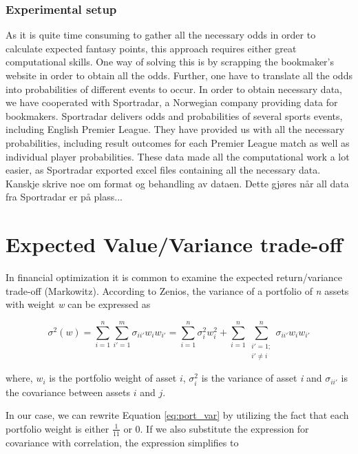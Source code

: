 \subsubsection{Experimental setup}
As it is quite time consuming to gather all the necessary odds in order to calculate expected fantasy points, this approach requires either great computational skills. One way of solving this is by scrapping the bookmaker's website in order to obtain all the odds. Further, one have to translate all the odds into probabilities of different events to occur. 
\newpar
In order to obtain necessary data, we have cooperated with Sportradar, a Norwegian company providing data for bookmakers. Sportradar delivers odds and probabilities of several sports events, including English Premier League. They have provided us with all the necessary probabilities, including result outcomes for each Premier League match as well as individual player probabilities. These data made all the computational work a lot easier, as Sportradar exported excel files containing all the necessary data. 
\newpar
Kanskje skrive noe om format og behandling av dataen. Dette gjøres når all data fra Sportradar er på plass...

\section{Expected Value/Variance trade-off}

In financial optimization it is common to examine the expected return/variance trade-off (Markowitz). According to Zenios, the variance of a portfolio of \textit{n} assets with weight \textit{w} can be expressed as 

\begin{equation}
    \sigma^2(w) = \sum_{i = 1}^{n}\sum_{i' = 1}^{m}\sigma_{ii'}w_iw_{i'} = \sum_{i = 1}^{n}\sigma_{i}^2w_i^2 + \sum_{i = 1}^{n}\sum_{\substack{i' = 1;\\ i' \neq i}}^{n}\sigma_{ii'}w_iw_{i'}
    \label{eq:port_var}
\end{equation}

where, $w_i$ is the portfolio weight of asset $i$, $\sigma_{i}^2$ is the variance of asset \textit{i} and $\sigma_{ii'}$ is the covariance between assets $i$ and $j$. \newpar

In our case, we can rewrite Equation \ref{eq:port_var} by utilizing the fact that each portfolio weight is either $\frac{1}{11}$ or $0$. If we also substitute the expression for covariance with correlation, the expression simplifies to

